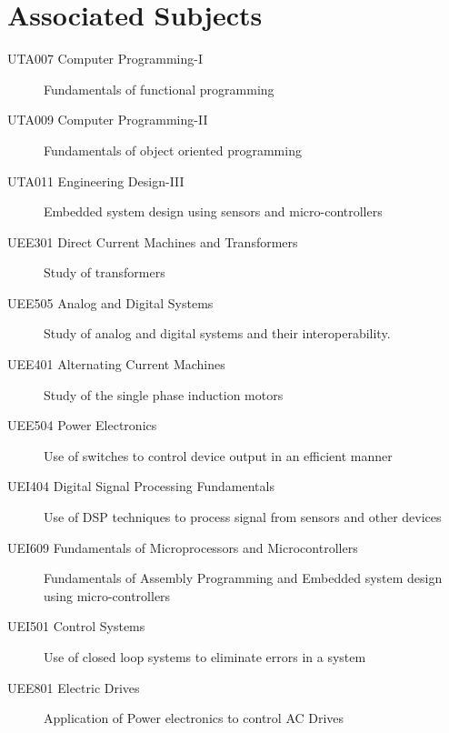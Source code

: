 \documentclass[12pt,a4paper,titlepage,twoside]{article}
\begin{document}
        \section{Associated Subjects}
            \begin{center}
                \begin{description}
                    \item [UTA007 Computer Programming-I] 
                    Fundamentals of functional programming
                    \item [UTA009 Computer Programming-II] 
                    Fundamentals of object oriented programming
                    \item [UTA011 Engineering Design-III] 
                    Embedded system design using sensors and micro-controllers
                    \item [UEE301 Direct Current Machines and Transformers]
                    Study of transformers
                    \item [UEE505 Analog and Digital Systems] 
                    Study of analog and digital systems and their interoperability.
                    \item [UEE401 Alternating Current Machines] 
                    Study of the single phase induction motors
                    \item [UEE504 Power Electronics] 
                    Use of switches to control device output in an efficient manner
                    \item [UEI404 Digital Signal Processing Fundamentals] 
                    Use of DSP techniques to process signal from sensors and other devices
                    \item [UEI609 Fundamentals of Microprocessors and Microcontrollers] 
                    Fundamentals of Assembly Programming and Embedded system design using micro-controllers 
                    \item [UEI501 Control Systems] 
                    Use of closed loop systems to eliminate errors in a system 
                    \item [UEE801 Electric Drives] 
                    Application of Power electronics to control AC Drives
                \end{description}
            \end{center}
        
\end{document}
